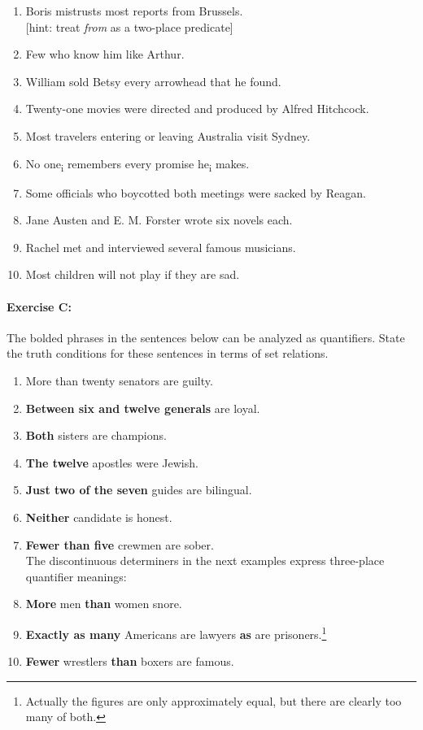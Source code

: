 {\begin{enumerate}
\item Boris mistrusts most reports from Brussels.\\
{}[hint: treat \textit{from} as a two-place predicate]
\item Few who know him like Arthur.
\item William sold Betsy every arrowhead that he found.
\item Twenty-one movies were directed and produced by Alfred Hitchcock.
\item Most travelers entering or leaving Australia visit Sydney.
\item No one\textsubscript{i} remembers every promise he\textsubscript{i} makes.
\item Some officials who boycotted both meetings were sacked by Reagan.
\item Jane Austen and E. M. Forster wrote six novels each.
\item Rachel met and interviewed several famous musicians.
\item Most children will not play if they are sad.
\end{enumerate}

\paragraph*{Exercise C:} The bolded phrases in the sentences below can be analyzed as quantifiers. State the truth conditions for these sentences in terms of set relations. 


\begin{enumerate}
\item More than twenty  senators are guilty.   


\item \textbf{Between six and twelve generals} are loyal.
\item \textbf{Both} sisters are champions.
\item \textbf{The twelve} apostles were Jewish.
\item \textbf{Just two of the seven} guides are bilingual.
\item \textbf{Neither} candidate is honest.
\item \textbf{Fewer than five} crewmen are sober. \\

The discontinuous determiners in the next examples express three-place quantifier meanings:

\item \textbf{More} men \textbf{than} women snore.
\item \textbf{Exactly as many} Americans are lawyers \textbf{as} are prisoners.\footnote{Actually the figures are only approximately equal, but there are clearly too many of both.} 
\item \textbf{Fewer} wrestlers \textbf{than} boxers are famous. 
\end{enumerate}
}
